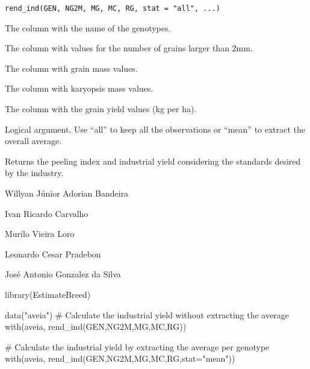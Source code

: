 \documentclass[a4paper]{book}
\begin{document}
%
\begin{Usage}
\begin{verbatim}
rend_ind(GEN, NG2M, MG, MC, RG, stat = "all", ...)
\end{verbatim}
\end{Usage}
%
\begin{Arguments}
\begin{ldescription}
\item[\code{GEN}] The column with the name of the genotypes.

\item[\code{NG2M}] The column with values for the number of grains larger than 2mm.

\item[\code{MG}] The column with grain mass values.

\item[\code{MC}] The column with karyopsis mass values.

\item[\code{RG}] The column with the grain yield values (kg per ha).

\item[\code{stat}] Logical argument. Use “all” to keep all the observations or “mean”
to extract the overall average.
\end{ldescription}
\end{Arguments}
%
\begin{Value}
Returns the peeling index and industrial yield considering the
standards desired by the industry.
\end{Value}
%
\begin{Author}
Willyan Júnior Adorian Bandeira

Ivan Ricardo Carvalho

Murilo Vieira Loro

Leonardo Cesar Pradebon

José Antonio Gonzalez da Silva
\end{Author}
%
\begin{Examples}
\begin{ExampleCode}

library(EstimateBreed)

data("aveia")
# Calculate the industrial yield without extracting the average
with(aveia, rend_ind(GEN,NG2M,MG,MC,RG))

# Calculate the industrial yield by extracting the average per genotype
with(aveia, rend_ind(GEN,NG2M,MG,MC,RG,stat="mean"))

\end{ExampleCode}
\end{Examples}
\end{document}
